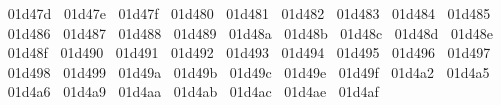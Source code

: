 {  ^^^^^^01d47d%
  ^^^^^^01d47e%
  ^^^^^^01d47f%
  ^^^^^^01d480%
  ^^^^^^01d481%
  ^^^^^^01d482%
  ^^^^^^01d483%
  ^^^^^^01d484%
  ^^^^^^01d485%
  ^^^^^^01d486%
  ^^^^^^01d487%
  ^^^^^^01d488%
  ^^^^^^01d489%
  ^^^^^^01d48a%
  ^^^^^^01d48b%
  ^^^^^^01d48c%
  ^^^^^^01d48d%
  ^^^^^^01d48e%
  ^^^^^^01d48f%
  ^^^^^^01d490%
  ^^^^^^01d491%
  ^^^^^^01d492%
  ^^^^^^01d493%
  ^^^^^^01d494%
  ^^^^^^01d495%
  ^^^^^^01d496%
  ^^^^^^01d497%
  ^^^^^^01d498%
  ^^^^^^01d499%
  ^^^^^^01d49a%
  ^^^^^^01d49b%
  ^^^^^^01d49c%
  ^^^^^^01d49e%
  ^^^^^^01d49f%
  ^^^^^^01d4a2%
  ^^^^^^01d4a5%
  ^^^^^^01d4a6%
  ^^^^^^01d4a9%
  ^^^^^^01d4aa%
  ^^^^^^01d4ab%
  ^^^^^^01d4ac%
  ^^^^^^01d4ae%
  ^^^^^^01d4af%
}
